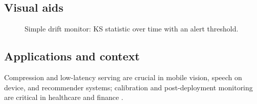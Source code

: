 \subsection{Visual aids}

\begin{figure}[h]
  \centering
  \caption{Simple drift monitor: KS statistic over time with an alert threshold.}
  \label{fig:drift-monitor}
\end{figure}

\subsection{Applications and context}

Compression and low-latency serving are crucial in mobile vision, speech on device, and recommender systems; calibration and post-deployment monitoring are critical in healthcare and finance \textcite{Ronneberger2015,Prince2023}.
